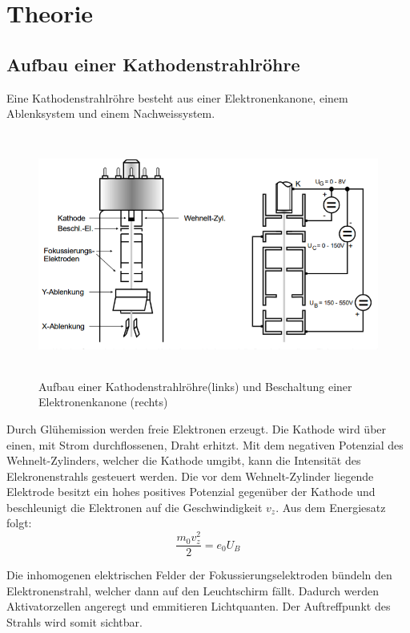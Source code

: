 \section{Theorie}
\label{sec:Theorie}



\subsection{Aufbau einer Kathodenstrahlröhre}

Eine Kathodenstrahlröhre besteht aus einer Elektronenkanone, einem Ablenksystem und einem Nachweissystem.

\begin{figure}[H]
  \centering
  \includegraphics[height=8cm]{kathodenstrahlroehre.PNG}
  \caption{Aufbau einer Kathodenstrahlröhre(links) und Beschaltung einer Elektronenkanone (rechts)}
  \label{fig:kathode}
\end{figure}

Durch Glühemission werden freie Elektronen erzeugt. Die Kathode wird über einen, mit Strom durchflossenen, Draht
erhitzt.
Mit dem negativen Potenzial des Wehnelt-Zylinders, welcher die Kathode umgibt, kann die
Intensität des Elekronenstrahls gesteuert werden.
Die vor dem Wehnelt-Zylinder liegende Elektrode besitzt ein hohes positives Potenzial gegenüber der Kathode
und beschleunigt die Elektronen auf die Geschwindigkeit $v_z$.
Aus dem Energiesatz folgt:
\begin{equation}
  \frac{m_0 v_z^2}{2} = e_0 U_B
  \label{eqn:energie}
\end{equation}

Die inhomogenen elektrischen Felder der Fokussierungselektroden bündeln den Elektronenstrahl, welcher dann
auf den Leuchtschirm fällt. Dadurch werden Aktivatorzellen angeregt und emmitieren Lichtquanten.
Der Auftreffpunkt des Strahls wird somit sichtbar.

